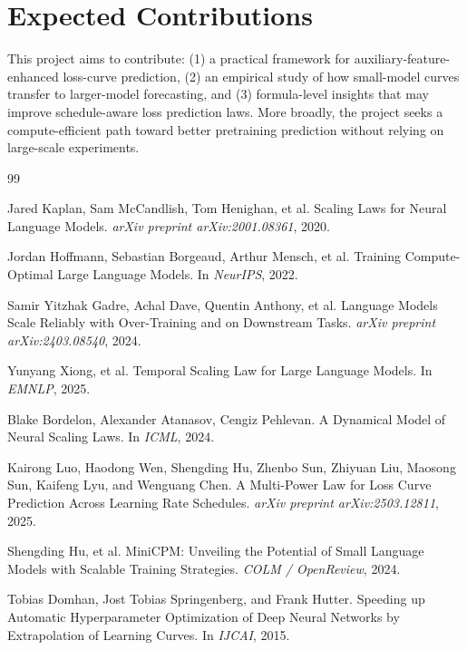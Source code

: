 \documentclass[10pt]{article}
\begin{document}
\section{Expected Contributions}
This project aims to contribute: (1) a practical framework for auxiliary-feature-enhanced loss-curve prediction, (2) an empirical study of how small-model curves transfer to larger-model forecasting, and (3) formula-level insights that may improve schedule-aware loss prediction laws. More broadly, the project seeks a compute-efficient path toward better pretraining prediction without relying on large-scale experiments.

\newpage

\begin{thebibliography}{99}\small

Jared Kaplan, Sam McCandlish, Tom Henighan, et al.
\newblock Scaling Laws for Neural Language Models.
\newblock \emph{arXiv preprint arXiv:2001.08361}, 2020.

Jordan Hoffmann, Sebastian Borgeaud, Arthur Mensch, et al.
\newblock Training Compute-Optimal Large Language Models.
\newblock In \emph{NeurIPS}, 2022.

Samir Yitzhak Gadre, Achal Dave, Quentin Anthony, et al.
\newblock Language Models Scale Reliably with Over-Training and on Downstream Tasks.
\newblock \emph{arXiv preprint arXiv:2403.08540}, 2024.

Yunyang Xiong, et al.
\newblock Temporal Scaling Law for Large Language Models.
\newblock In \emph{EMNLP}, 2025.

Blake Bordelon, Alexander Atanasov, Cengiz Pehlevan.
\newblock A Dynamical Model of Neural Scaling Laws.
\newblock In \emph{ICML}, 2024.

Kairong Luo, Haodong Wen, Shengding Hu, Zhenbo Sun, Zhiyuan Liu, Maosong Sun, Kaifeng Lyu, and Wenguang Chen.
\newblock A Multi-Power Law for Loss Curve Prediction Across Learning Rate Schedules.
\newblock \emph{arXiv preprint arXiv:2503.12811}, 2025.

Shengding Hu, et al.
\newblock MiniCPM: Unveiling the Potential of Small Language Models with Scalable Training Strategies.
\newblock \emph{COLM / OpenReview}, 2024.

Tobias Domhan, Jost Tobias Springenberg, and Frank Hutter.
\newblock Speeding up Automatic Hyperparameter Optimization of Deep Neural Networks by Extrapolation of Learning Curves.
\newblock In \emph{IJCAI}, 2015.


\end{thebibliography}
\end{document}

